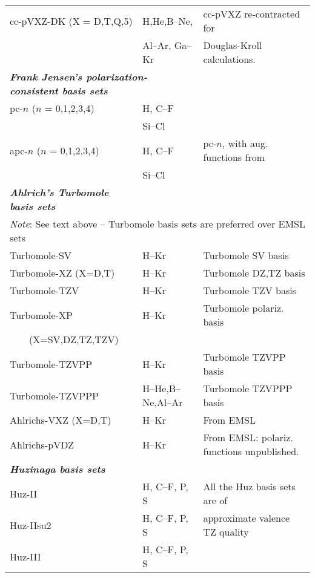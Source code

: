 \begin{longtable}{lll}
cc-pVXZ-DK (X = D,T,Q,5) & H,He,B--Ne, & \cite{thdjcp90,dewthdjcp100,dewthdjcp98,akwdewkapthdjcp110} 
  cc-pVXZ re-contracted for \\
  & Al--Ar, Ga--Kr & Douglas-Kroll calculations.\\
\hline
\multicolumn{2}{l}{\bf{\emph{Frank Jensen's polarization-consistent basis 
sets\index{basis set!polarization-consistent}\index{polarization-consistent basis set}}}} \\
pc-$n$ ($n$ = 0,1,2,3,4)  & H, C--F & \cite{fjjcp115,fjjcp116} \\
                      & Si--Cl & \cite{fjthjcp121} \\
apc-$n$ ($n$ = 0,1,2,3,4) & H, C--F & pc-$n$, with aug. functions from \cite{fjjcp117} \\
                      & Si--Cl & \cite{fjthjcp121} \\
\hline
\bf{\emph{Ahlrich's Turbomole basis sets}} & & \\
\multicolumn{3}{l}{\emph{Note}: See text above -- Turbomole basis sets are preferred over EMSL sets} \\
Turbomole-SV & H--Kr & \cite{ashhrajcp97} Turbomole SV basis\\
Turbomole-XZ (X=D,T) & H--Kr & \cite{ashhrajcp97} Turbomole DZ,TZ basis\\
Turbomole-TZV & H--Kr & \cite{aschrajcp100} Turbomole TZV basis \\
Turbomole-XP & H--Kr & \cite{ashhrajcp97,aschrajcp100} Turbomole polariz. basis \\
 ~~~~(X=SV,DZ,TZ,TZV) & & \\
Turbomole-TZVPP & H--Kr & \cite{aschrajcp100} Turbomole TZVPP basis \\
Turbomole-TZVPPP & H--He,B--Ne,Al--Ar & \cite{aschrajcp100} Turbomole TZVPPP basis \\
Ahlrichs-VXZ (X=D,T) & H--Kr & \cite{ashhrajcp97} From EMSL \\
Ahlrichs-pVDZ & H--Kr & \cite{ashhrajcp97} From EMSL: polariz. functions unpublished.\\
\hline
%
\bf{\emph{Huzinaga basis sets}} & & \\
Huz-II & H, C--F, P, S & \cite{wkijc19,mswkjcp76,huzinagaintern} All the Huz basis sets are of\\
Huz-IIsu2 & H, C--F, P, S & \cite{wkijc19,mswkjcp76,huzinagaintern} approximate valence TZ quality\\
Huz-III & H, C--F, P, S & \cite{wkijc19,mswkjcp76,huzinagaintern} \\

\end{longtable}
